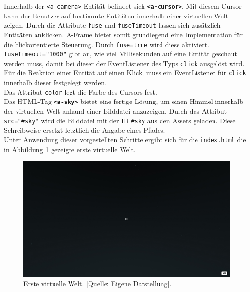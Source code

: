 \documentclass[a4paper,12pt,oneside]{article}
\begin{document}
        Innerhalb der \texttt{<a-camera>}-Entität befindet sich 
        \texttt{\textbf{<a-cursor>}}. Mit diesem Cursor kann der Benutzer
        auf bestimmte Entitäten innerhalb einer virtuellen Welt zeigen. Durch
        die Attribute \texttt{fuse} und \texttt{fuseTimeout} lassen sich 
        zusätzlich Entitäten anklicken. A-Frame bietet somit grundlegend 
        eine Implementation für die blickorientierte Steuerung. Durch 
        \texttt{fuse=true} wird diese aktiviert.
        \texttt{fuseTimeout="1000"} gibt an, wie viel Millisekunden 
        auf eine Entität geschaut werden muss, 
        damit bei dieser der EventListener des Typs
        \texttt{click} ausgelöst wird. 
        Für die Reaktion einer Entität auf einen Klick, muss 
        ein EventListener für \texttt{click} innerhalb dieser festgelegt
        werden. \\
        Das Attribut \texttt{color} legt die Farbe des Cursors fest. \\
        Das HTML-Tag \texttt{\textbf{<a-sky>}} bietet eine fertige Lösung,
        um einen Himmel innerhalb der virtuellen Welt anhand einer Bilddatei
        anzuzeigen. Durch das Attribut \texttt{src="\#sky"} wird die
        Bilddatei mit der ID \texttt{\#sky} aus den Assets geladen. Diese
        Schreibweise ersetzt letztlich die Angabe eines Pfades. \\
        Unter Anwendung dieser vorgestellten Schritte ergibt sich für
        die \texttt{index.html} die in Abbildung \ref{fig:vr-welt1} gezeigte
        erste virtuelle Welt.
        \begin{figure}
          \centering
          \includegraphics[scale=0.3]{img/coding/vr-welt1.png}
          \caption[Erste virtuelle Welt.]{Erste virtuelle Welt. [Quelle: Eigene Darstellung].}
          \label{fig:vr-welt1}
        \end{figure}
\end{document}
